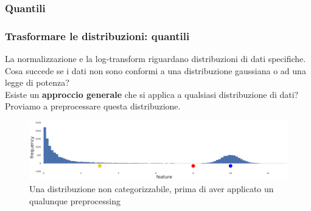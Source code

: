 \subsubsection[Quantili]{Quantili}
\begin{frame}
	
	\frametitle{{\color{GradientDescentDiagramOrange}Trasformare le distribuzioni}: {\color{GradientDescentDiagramGreen}quantili}}
		
		La normalizzazione e la log-transform riguardano distribuzioni di dati specifiche.\\
		Cosa succede se i dati non sono conformi a una distribuzione gaussiana o ad una legge di potenza?\\
		Esiste un \textbf{approccio generale} che si applica a qualsiasi distribuzione di dati? Proviamo a preprocessare questa distribuzione.
		
		\begin{figure}[!htbp]
			\centering
			\includegraphics[width=12.0cm]{images/data_prep/scaling_distributions/Preprocess.png}
					\caption{Una distribuzione non categorizzabile, \newline prima di aver applicato un qualunque preprocessing}
		\end{figure}
	
\end{frame}


